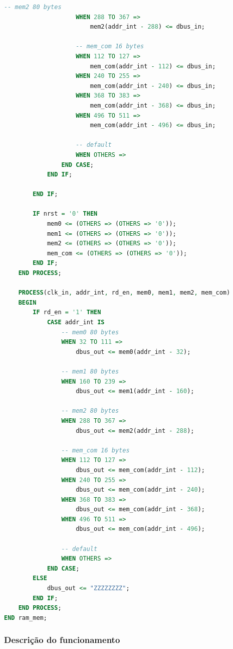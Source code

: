 \documentclass{article}
\begin{document}
\begin{lstlisting}[language=VHDL, caption={Código VHDL fsr\_reg}]
                    -- mem2 80 bytes
                    WHEN 288 TO 367 =>
                        mem2(addr_int - 288) <= dbus_in;

                    -- mem_com 16 bytes
                    WHEN 112 TO 127 =>
                        mem_com(addr_int - 112) <= dbus_in;
                    WHEN 240 TO 255 =>
                        mem_com(addr_int - 240) <= dbus_in;
                    WHEN 368 TO 383 =>
                        mem_com(addr_int - 368) <= dbus_in;
                    WHEN 496 TO 511 =>
                        mem_com(addr_int - 496) <= dbus_in;

                    -- default
                    WHEN OTHERS =>
                END CASE;
            END IF;

        END IF;
        
        IF nrst = '0' THEN
            mem0 <= (OTHERS => (OTHERS => '0'));
            mem1 <= (OTHERS => (OTHERS => '0'));
            mem2 <= (OTHERS => (OTHERS => '0'));
            mem_com <= (OTHERS => (OTHERS => '0'));
        END IF;
    END PROCESS;

    PROCESS(clk_in, addr_int, rd_en, mem0, mem1, mem2, mem_com)
    BEGIN
        IF rd_en = '1' THEN
            CASE addr_int IS 
                -- mem0 80 bytes
                WHEN 32 TO 111 =>
                    dbus_out <= mem0(addr_int - 32);

                -- mem1 80 bytes
                WHEN 160 TO 239 =>
                    dbus_out <= mem1(addr_int - 160);

                -- mem2 80 bytes
                WHEN 288 TO 367 =>
                    dbus_out <= mem2(addr_int - 288);

                -- mem_com 16 bytes
                WHEN 112 TO 127 =>
                    dbus_out <= mem_com(addr_int - 112);
                WHEN 240 TO 255 =>
                    dbus_out <= mem_com(addr_int - 240);
                WHEN 368 TO 383 =>
                    dbus_out <= mem_com(addr_int - 368);
                WHEN 496 TO 511 =>
                    dbus_out <= mem_com(addr_int - 496);

                -- default
                WHEN OTHERS =>
            END CASE;
        ELSE
            dbus_out <= "ZZZZZZZZ";
        END IF;
    END PROCESS;
END ram_mem;     
\end{lstlisting}

\subsubsection{Descrição do funcionamento}
\end{document}
